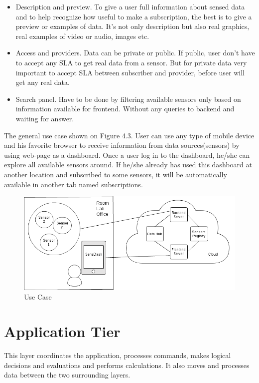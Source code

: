 \begin{itemize}
      \item Description and preview. To give a user full information about sensed data and to help recognize how useful to make a subscription, the best is to give a preview or examples of data. It's not only description but also real graphics, real examples of video or audio, images etc.
      \item Access and providers. Data can be private or public. If public, user don't have to accept any SLA to get real data from a sensor. But for private data very important to accept SLA between subscriber and provider, before user will get any real data.
      \item Search panel. Have to be done by filtering available sensors only based on information available for frontend. Without any queries to backend and waiting for answer.
      \end{itemize}

    The general use case shown on Figure 4.3. User can use any type of mobile device and his favorite browser to receive information from data sources(sensors) by using web-page as a dashboard. Once a user log in to the dashboard, he/she can explore all available sensors around. If he/she already has used this dashboard at another location and subscribed to some sensors, it will be automatically available in another tab named subscriptions. 

        \begin{figure}[!ht]
        \centering
        \includegraphics[scale=0.6]{images/User_Case.png}   
        \caption[Use Case]{Use Case}                        
        \end{figure}

\section{Application Tier}
  This layer coordinates the application, processes commands, makes logical decisions and evaluations and performs calculations. It also moves and processes data between the two surrounding layers.

